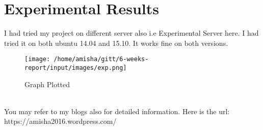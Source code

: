 
\section{Experimental Results}
I had tried my project on different server also i.e Experimental Server here. I had tried it on both ubuntu 14.04 and 15.10. It works fine on both versions.
\begin{figure}[!ht]
	\centering
	\texttt{[image: /home/amisha/gitt/6-weeks-report/input/images/exp.png]}                
	\caption{Graph Plotted}
	\hspace{-1.5em}
\end{figure}\\
You may refer to my blogs also for detailed information.
Here is the url: 
https://amisha2016.wordpress.com/

 
 
 

